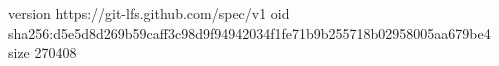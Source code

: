 version https://git-lfs.github.com/spec/v1
oid sha256:d5e5d8d269b59caff3c98d9f94942034f1fe71b9b255718b02958005aa679be4
size 270408

